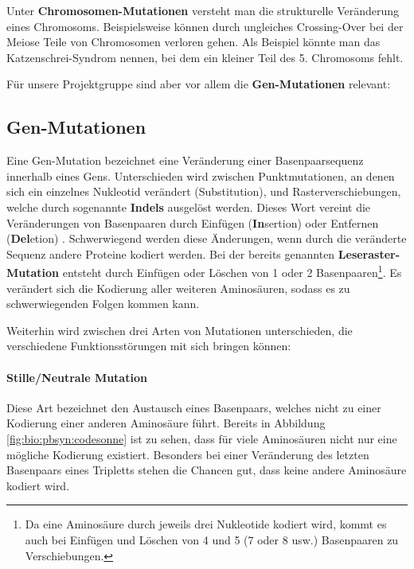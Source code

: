 Unter \textbf{Chromosomen-Mutationen} versteht man die strukturelle Veränderung eines Chromosoms. Beispielsweise können durch ungleiches Crossing-Over bei der Meiose Teile von Chromosomen verloren gehen. Als Beispiel könnte man das Katzenschrei-Syndrom nennen, bei dem ein kleiner Teil des 5. Chromosoms fehlt.

Für unsere Projektgruppe sind aber vor allem die \textbf{Gen-Mutationen} relevant:

\subsection{Gen-Mutationen}
\label{sec:bio:muta:gen}

Eine Gen-Mutation bezeichnet eine Veränderung einer Basenpaarsequenz innerhalb eines Gens. Unterschieden wird zwischen Punktmutationen, an denen sich ein einzelnes Nukleotid verändert (Substitution), und Rasterverschiebungen, welche durch sogenannte \textbf{Indels} ausgelöst werden. Dieses Wort vereint die Veränderungen von Basenpaaren durch Einfügen (\textbf{In}sertion) oder Entfernen (\textbf{Del}etion) \citep{Knippers2006}. Schwerwiegend werden diese Änderungen, wenn durch die veränderte Sequenz andere Proteine kodiert werden. Bei der bereits genannten \textbf{Leseraster-Mutation} entsteht durch Einfügen oder Löschen von 1 oder 2 Basenpaaren\footnote{Da eine Aminosäure durch jeweils drei Nukleotide kodiert wird, kommt es auch bei Einfügen und Löschen von 4 und 5 (7 oder 8 usw.) Basenpaaren zu Verschiebungen.}. Es verändert sich die Kodierung aller weiteren Aminosäuren, sodass es zu schwerwiegenden Folgen kommen kann.

Weiterhin wird zwischen drei Arten von Mutationen unterschieden, die verschiedene Funktionsstörungen mit sich bringen können:

\paragraph{Stille/Neutrale Mutation} Diese Art bezeichnet den Austausch eines Basenpaars, welches nicht zu einer Kodierung einer anderen Aminosäure führt. Bereits in Abbildung \ref{fig:bio:pbsyn:codesonne} ist zu sehen, dass für viele Aminosäuren nicht nur eine mögliche Kodierung existiert. Besonders bei einer Veränderung des letzten Basenpaars eines Tripletts stehen die Chancen gut, dass keine andere Aminosäure kodiert wird.

